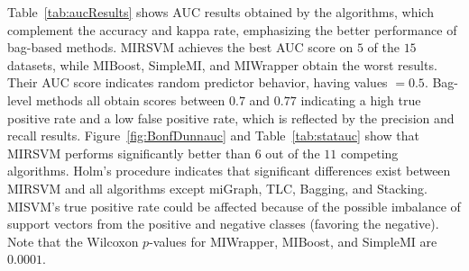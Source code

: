\documentclass[reqno]{vcuthesis}
\numberwithin{equation}{chapter}
\begin{document}
\begin{table}[b!]
{}\vspace{-1.3em}
\label{fig:BonfDunnauc}\vspace{-1.3em}
\label{tab:statauc}
\vspace{-1em}
\scriptsize \centering
{}
\end{table}
Table~\ref{tab:aucResults} shows AUC results obtained by the algorithms, which complement the accuracy and kappa rate, emphasizing the better performance of bag-based methods. MIRSVM achieves the best AUC score on $5$ of the $15$ datasets, while MIBoost, SimpleMI, and MIWrapper obtain the worst results. Their AUC score indicates random predictor behavior, having values $= 0.5$. Bag-level methods all obtain scores between $0.7$ and $0.77$ indicating a high true positive rate and a low false positive rate, which is reflected by the precision and recall results. Figure~\ref{fig:BonfDunnauc} and Table~\ref{tab:statauc} show that MIRSVM performs significantly better than $6$ out of the $11$ competing algorithms. Holm's procedure indicates that significant differences exist between MIRSVM and all algorithms except miGraph, TLC, Bagging, and Stacking. MISVM's true positive rate could be affected because of the possible imbalance of support vectors from the positive and negative classes (favoring the negative). Note that the Wilcoxon $p$-values for MIWrapper, MIBoost, and SimpleMI are $0.0001$. 
\end{document}
